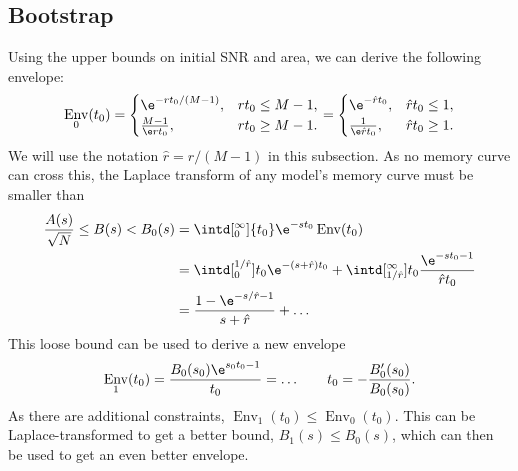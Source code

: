 \documentclass[12pt]{article}
\DeclareMathOperator{\env}{Env}
\newcommand{\rh}{\hat{r}}
\begin{document}
\subsection{Bootstrap}\label{sec:boot}

Using the upper bounds on initial SNR and area, we can derive the following envelope:
%
\begin{equation}\label{sec:envinitarea}
  \env_0(t_0) =
    \begin{cases}
    \e^{-rt_0/(M-1)},    & rt_0 \leq M-1,\\
    \frac{M-1}{\e rt_0}, & rt_0 \geq M-1.
    \end{cases}
    =
    \begin{cases}
    \e^{-\rh t_0},        & \rh t_0 \leq 1,\\
    \frac{1}{\e \rh t_0}, & \rh t_0 \geq 1.
    \end{cases}
\end{equation}
%
We will use the notation $\rh=r/(M-1)$ in this subsection.
As no memory curve can cross this, the Laplace transform of any model's memory curve must be smaller than
%
\begin{equation}\label{eq:envlt}
\begin{aligned}
  \frac{A(s)}{\sqrt{N}} \leq B(s) < B_0(s) &= \intd[_0^\infty]{t_0} \e^{-st_0}\env(t_0) \\
   &= \intd[_0^{1/\rh}]{t_0} \e^{-(s+\rh)t_0}
   + \intd[_{1/\rh}^\infty]{t_0} \frac{\e^{-st_0-1}}{\rh t_0} \\
   &= \frac{1-\e^{-s/\rh-1}}{s+\rh} + \ldots
\end{aligned}
\end{equation}
%
This loose bound can be used to derive a new envelope
%
\begin{equation}\label{eq:envb0}
  \env_1(t_0) = \frac{B_0(s_0) \e^{s_0t_0-1}}{t_0} = \ldots
  \qquad t_0 = -\frac{B_0'(s_0)}{B_0(s_0)}. 
\end{equation}
%
As there are additional constraints, $\env_1(t_0) \leq \env_0(t_0)$.
This can be Laplace-transformed to get a better bound, $B_1(s) \leq B_0(s)$, which can then be used to get an even better envelope.
\end{document}

